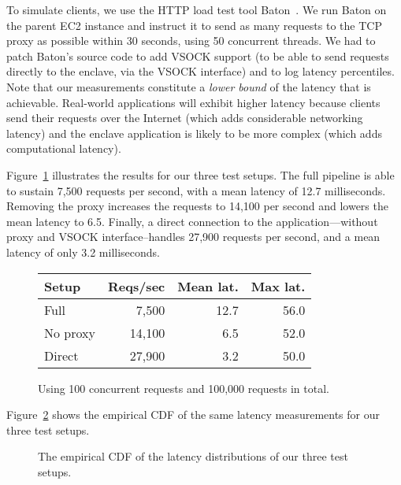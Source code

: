 To simulate clients, we use the HTTP load test tool Baton~\cite{baton}.  We run
Baton on the parent EC2 instance and instruct it to send as many requests to the
TCP proxy as possible within 30 seconds, using 50 concurrent threads.  We had to
patch Baton's source code to add VSOCK support (to be able to send requests
directly to the enclave, via the VSOCK interface) and to log latency
percentiles.  Note that our measurements constitute a \emph{lower bound} of the
latency that is achievable.  Real-world applications will exhibit higher latency
because clients send their requests over the Internet (which adds considerable
networking latency) and the enclave application is likely to be more complex
(which adds computational latency).

Figure~\ref{fig:latency-msmts} illustrates the results for our three test
setups.  The full pipeline is able to sustain 7,500 requests per second, with a
mean latency of 12.7 milliseconds.  Removing the proxy increases the requests
to 14,100 per second and lowers the mean latency to 6.5.  Finally, a direct
connection to the application---without proxy and VSOCK interface--handles
27,900 requests per second, and a mean latency of only 3.2 milliseconds.

\begin{figure}[t]
    \centering
    \begin{tabular}{l r r r}
    \toprule
    Setup & Reqs/sec & Mean lat. & Max lat. \\
    \midrule
    Full & 7,500 & 12.7 & 56.0 \\
    No proxy & 14,100 & 6.5 & 52.0 \\
    Direct & 27,900 & 3.2 & 50.0 \\
    \bottomrule
    \end{tabular}
    \caption{Using 100 concurrent requests and 100,000 requests in total.}
    \label{fig:latency-msmts}
\end{figure}

Figure~\ref{fig:latency-cdf} shows the empirical CDF of the same latency
measurements for our three test setups.

\begin{figure}[t]
    \centering
    
    \label{fig:latency-cdf}
    \caption{The empirical CDF of the latency distributions of our three test setups.}
\end{figure}


